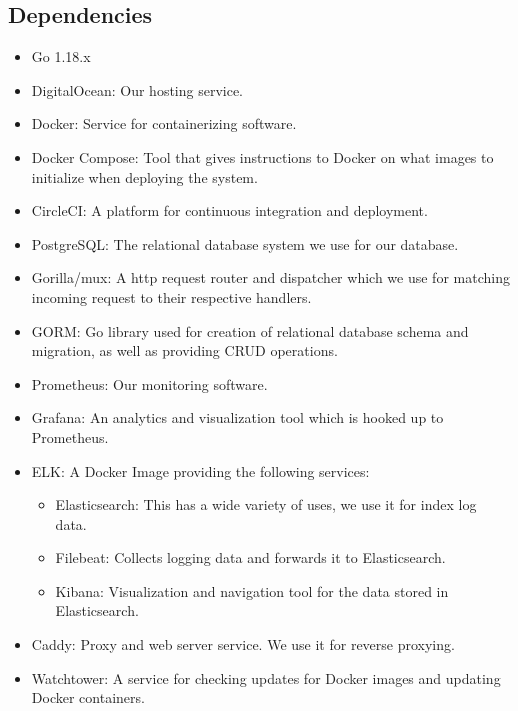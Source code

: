 \subsection{Dependencies}
\begin{itemize}
    \item Go 1.18.x
    \vspace{0.5em}
    \item DigitalOcean: Our hosting service.
    \vspace{0.5em}
    \item Docker: Service for containerizing software.
    \vspace{0.5em}
    \item Docker Compose: Tool that gives instructions to Docker on what images to initialize when deploying the system. 
    \vspace{0.5em}
    \item CircleCI: A platform for continuous integration and deployment.
    \vspace{0.5em}
    \item PostgreSQL: The relational database system we use for our database. \vspace{0.5em}
    \item Gorilla/mux: A http request router and dispatcher which we use for matching incoming request to their respective handlers. 
    \vspace{0.5em}
    \item GORM: Go library used for creation of relational database schema and migration, as well as providing CRUD operations. 
    \vspace{0.5em}
    \item Prometheus: Our monitoring software.
    \vspace{0.5em}
    \item Grafana: An analytics and visualization tool which is hooked up to Prometheus.
    \vspace{0.5em}
    \item ELK: A Docker Image providing the following services: 
    \vspace{0.5em}
    \begin{itemize}
        \item Elasticsearch: This has a wide variety of uses, we use it for index log data.
        \vspace{0.5em}
        \item Filebeat: Collects logging data and forwards it to Elasticsearch.
        \vspace{0.5em}
        \item Kibana: Visualization and navigation tool for the data stored in Elasticsearch. 
        \vspace{0.5em}
    \end{itemize}
    \item Caddy: Proxy and web server service. We use it for reverse proxying.
    \vspace{0.5em}
    \item Watchtower: A service for checking updates for Docker images and updating Docker containers.
\end{itemize}

